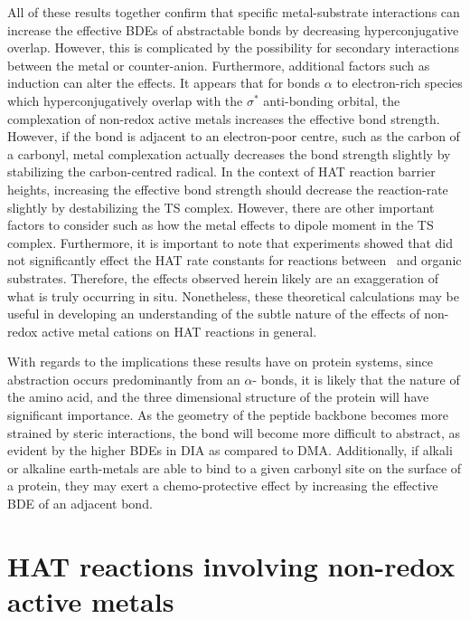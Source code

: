All of these results together confirm that specific metal-substrate
interactions can increase the effective BDEs of abstractable  bonds by
decreasing hyperconjugative overlap. However, this is complicated by the
possibility for secondary interactions between the metal or counter-anion.
Furthermore, additional factors such as induction can alter the effects. It
appears that for  bonds $\alpha$ to electron-rich species which
hyperconjugatively overlap with the $\sigma^*$ anti-bonding orbital, the
complexation of non-redox active metals increases the effective  bond
strength. However, if the  bond is adjacent to an electron-poor centre,
such as the carbon of a carbonyl, metal complexation actually decreases the
bond strength slightly by stabilizing the carbon-centred radical.  In the
context of HAT reaction barrier heights, increasing the effective  bond
strength should decrease the reaction-rate slightly by destabilizing the TS
complex. However, there are other important factors to consider such as how the
metal effects to dipole moment in the TS complex.  Furthermore, it is important
to note that experiments showed that  did not significantly effect
the HAT rate constants for reactions between \cumo\ and organic substrates.
Therefore, the effects observed herein likely are an exaggeration of what is
truly occurring in situ. Nonetheless, these theoretical calculations may be
useful in developing an understanding of the subtle nature of the effects of
non-redox active metal cations on HAT reactions in general.

With regards to the implications these results have on protein systems, since
abstraction occurs predominantly from an $\alpha$- bonds, it is likely
that the nature of the amino acid, and the three dimensional structure of the
protein will have significant importance. As the geometry of the peptide
backbone becomes more strained by steric interactions, the  bond will
become more difficult to abstract, as evident by the higher  BDEs in
DIA as compared to DMA. Additionally, if alkali or alkaline earth-metals are
able to bind to a given carbonyl site on the surface of a protein, they may 
exert a chemo-protective effect by increasing the effective BDE of an adjacent
 bond.

\section{HAT reactions involving non-redox active metals}

